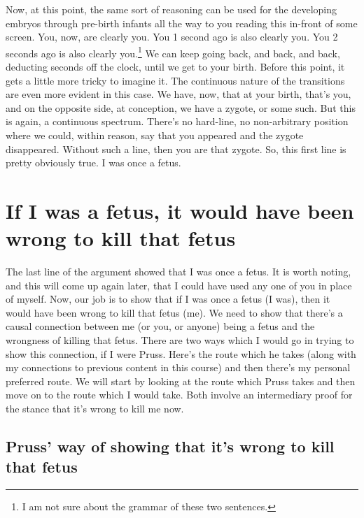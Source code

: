 Now, at this point, the same sort of reasoning can be used for the developing embryos through pre-birth infants all the way to you reading this in-front of some screen. You, now, are clearly you. You 1 second ago is also clearly you. You 2 seconds ago is also clearly you.\footnote{ I am not sure about the grammar of these two sentences.} We can keep going back, and back, and back, deducting seconds off the clock, until we get to your birth. Before this point, it gets a little more tricky to imagine it. The continuous nature of the transitions are even more evident in this case. We have, now, that at your birth, that's you, and on the opposite side, at conception, we have a zygote, or some such. But this is again, a continuous spectrum. There's no hard-line, no non-arbitrary position where we could, within reason, say that you appeared and the zygote disappeared.  Without such a line, then you are that zygote. So, this first line is pretty obviously true. I was once a fetus.

\section{If I was a fetus, it would have been wrong to kill that fetus}

The last line of the argument showed that I was once a fetus. It is worth noting, and this will come up again later, that I could have used any one of you in place of myself. Now, our job is to show that if I was once a fetus (I was), then it would have been wrong to kill that fetus (me). We need to show that there's a causal connection between me (or you, or anyone) being a fetus and the wrongness of killing that fetus. There are two ways which I would go in trying to show this connection, if I were Pruss. Here's the route which he takes  (along with my connections to previous content in this course) and then there's my personal preferred route. We will start by looking at the route which Pruss takes and then move on to the route which I would take. Both involve an intermediary proof for the stance that it's wrong to kill me now. 
\subsection{Pruss' way of showing that it's wrong to kill that fetus}

